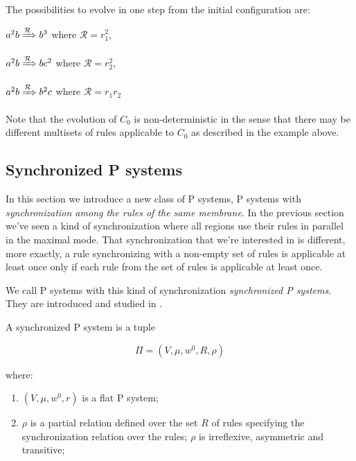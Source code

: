 The possibilities to evolve in one step from the initial configuration are: 
\begin{description}
    \item $a^2b \xRightarrow{\mathcal{R}} b^3$ where $\mathcal{R}=r_1^2$,
    \item $a^2b \xRightarrow{\mathcal{R}} bc^2$ where $\mathcal{R}=r_2^2$,
    \item $a^2b \xRightarrow{\mathcal{R}} b^2c$ where $\mathcal{R}=r_1 r_2$
\end{description}

Note that the evolution of $C_0$ is non-deterministic in the sense that there may be different multisets of rules applicable to $C_0$ as described in the example above.

\subsection{Synchronized P systems}

In this section we introduce a new class of P systems, P systems with \textit{synchronization among the rules of the same membrane}.
In the previous section we've seen a kind of synchronization where all regions use their rules in parallel in the maximal mode.
That synchronization that we're interested in is different, more exactly, a rule synchronizing with a non-empty set of rules is applicable at least once only if each rule from the set of rules is applicable at least once.

We call P systems with this kind of synchronization \textit{synchronized P systems}.
They are introduced and studied in \cite{aman2019synchronization,aman2022power}.

\begin{definition}
A synchronized P system is a tuple

\[ \Pi = (V,\mu,w^0,R,\rho) \]

where:
\begin{enumerate}
    \item $(V,\mu,w^0,r)$ is a flat P system;    
    \item $\rho$ is a partial relation defined over the set $R$ of rules specifying
    the synchronization relation over the rules;
    $\rho$ is irreflexive, asymmetric and transitive;
\end{enumerate}
\end{definition}

